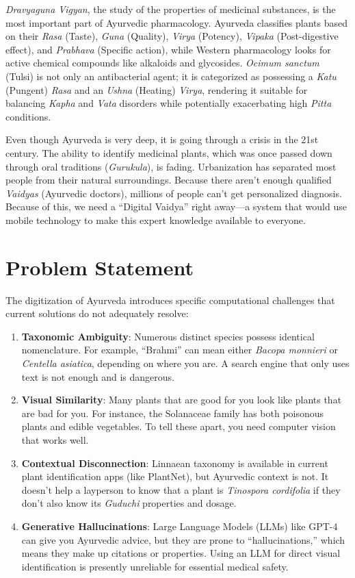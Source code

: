 \textit{Dravyaguna Vigyan}, the study of the properties of medicinal substances, is the most important part of Ayurvedic pharmacology. Ayurveda classifies plants based on their \textit{Rasa} (Taste), \textit{Guna} (Quality), \textit{Virya} (Potency), \textit{Vipaka} (Post-digestive effect), and \textit{Prabhava} (Specific action), while Western pharmacology looks for active chemical compounds like alkaloids and glycosides. \textit{Ocimum sanctum} (Tulsi) is not only an antibacterial agent; it is categorized as possessing a \textit{Katu} (Pungent) \textit{Rasa} and an \textit{Ushna} (Heating) \textit{Virya}, rendering it suitable for balancing \textit{Kapha} and \textit{Vata} disorders while potentially exacerbating high \textit{Pitta} conditions.

Even though Ayurveda is very deep, it is going through a crisis in the 21st century. The ability to identify medicinal plants, which was once passed down through oral traditions (\textit{Gurukula}), is fading. Urbanization has separated most people from their natural surroundings. Because there aren't enough qualified \textit{Vaidyas} (Ayurvedic doctors), millions of people can't get personalized diagnosis. Because of this, we need a ``Digital Vaidya'' right away---a system that would use mobile technology to make this expert knowledge available to everyone.

\newpage

\section{Problem Statement}
The digitization of Ayurveda introduces specific computational challenges that current solutions do not adequately resolve:
\begin{enumerate}[label={\textbf{\arabic*.}}, leftmargin=*]
    \item \textbf{Taxonomic Ambiguity}: Numerous distinct species possess identical nomenclature. For example, ``Brahmi'' can mean either \textit{Bacopa monnieri} or \textit{Centella asiatica}, depending on where you are. A search engine that only uses text is not enough and is dangerous.
    \item \textbf{Visual Similarity}: Many plants that are good for you look like plants that are bad for you. For instance, the Solanaceae family has both poisonous plants and edible vegetables. To tell these apart, you need computer vision that works well.
    \item \textbf{Contextual Disconnection}: Linnaean taxonomy is available in current plant identification apps (like PlantNet), but Ayurvedic context is not. It doesn't help a layperson to know that a plant is \textit{Tinospora cordifolia} if they don't also know its \textit{Guduchi} properties and dosage.
    \item \textbf{Generative Hallucinations}: Large Language Models (LLMs) like GPT-4 can give you Ayurvedic advice, but they are prone to ``hallucinations,'' which means they make up citations or properties. Using an LLM for direct visual identification is presently unreliable for essential medical safety.
\end{enumerate}

